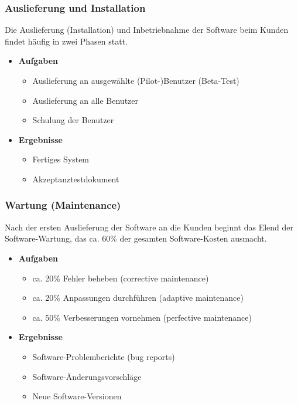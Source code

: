 	\subsubsection{Auslieferung und Installation}
	Die Auslieferung (Installation) und Inbetriebnahme der Software beim Kunden findet häufig in zwei Phasen statt.
	\begin{itemize}
		\item \textbf{Aufgaben}
		\begin{itemize}
			\item Auslieferung an ausgewählte (Pilot-)Benutzer (Beta-Test)
			\item Auslieferung an alle Benutzer
			\item Schulung der Benutzer
		\end{itemize}
		\item \textbf{Ergebnisse}
		\begin{itemize}
			\item Fertiges System
			\item Akzeptanztestdokument
		\end{itemize}
	\end{itemize}
	\subsubsection{Wartung (Maintenance)}
	Nach der ersten Auslieferung der Software an die Kunden beginnt das Elend der Software-Wartung, das ca. 60\% der gesamten Software-Kosten ausmacht.
	\begin{itemize}
		\item \textbf{Aufgaben}
		\begin{itemize}
			\item ca. 20\% Fehler beheben (corrective maintenance)
			\item ca. 20\% Anpassungen durchführen (adaptive maintenance)
			\item ca. 50\% Verbesserungen vornehmen (perfective maintenance)
		\end{itemize}
		\item \textbf{Ergebnisse}
		\begin{itemize}
			\item Software-Problemberichte (bug reports)
			\item Software-Änderungsvorschläge
			\item Neue Software-Versionen
		\end{itemize}
	\end{itemize}
